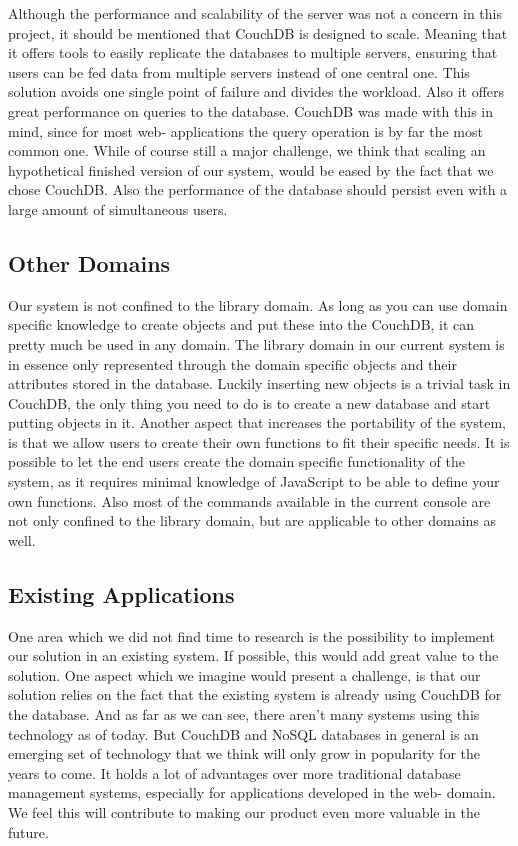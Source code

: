 Although the performance and scalability of the server was not a concern in this project, it should be mentioned that CouchDB is designed to scale. Meaning that it offers tools to easily replicate the databases to multiple servers, ensuring that users can be fed data from multiple servers instead of one central one. This solution avoids one single point of failure and divides the workload. Also it offers great performance on queries to the database. CouchDB was made with this in mind, since for most web- applications the query operation is by far the most common one. While of course still a major challenge, we think that scaling an hypothetical finished version of our system, would be eased by the fact that we chose CouchDB. Also the performance of the database should persist even with a large amount of simultaneous users.

\subsection{Other Domains}
Our system is not confined to the library domain. As long as you can use domain specific knowledge to create objects and put these into the CouchDB, it can pretty much be used in any domain. The library domain in our current system is in essence only represented through the domain specific objects and their attributes stored in the database. Luckily inserting new objects is a trivial task in CouchDB, the only thing you need to do is to create a new database and start putting objects in it. Another aspect that increases the portability of the system, is that we allow users to create their own functions to fit their specific needs. It is possible to let the end users create the domain specific functionality of the system, as it requires minimal knowledge of JavaScript to be able to define your own functions. Also most of the commands available in the current console are not only confined to the library domain, but are applicable to other domains as well.

\subsection{Existing Applications}
One area which we did not find time to research is the possibility to implement our solution in an existing system. If possible, this would add great value to the solution. One aspect which we  imagine would present a challenge, is that our solution relies on the fact that the existing system is already using CouchDB for the database. And as far as we can see, there aren’t many systems using this technology as of today. But CouchDB and NoSQL databases in general is an emerging set of technology that we think will only grow in popularity for the years to come. It holds a lot of advantages over more traditional database management systems, especially for applications developed in the web- domain. We feel this will contribute to making our product even more valuable in the future.

